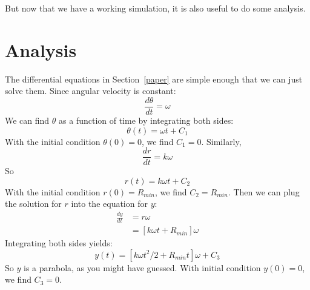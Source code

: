 \documentclass[12pt]{book}
\theoremstyle{exercise}
\newcommand{\py}{\verb}%}
\begin{document}

But now that we have a working simulation, it is also useful to do some analysis.


\section{Analysis}
\label{paper_analysis}

The differential equations in Section~\ref{paper} are simple enough that we can just solve them.  Since angular velocity is constant:
%
\[ \frac{d\theta}{dt} = \omega  \]
%
We can find $\theta$ as a function of time by integrating both sides:
%
\[ \theta(t) = \omega t + C_1 \]
%
With the initial condition $\theta(0)=0$,  we find $C_1=0$.  Similarly,
%
\begin{equation}
\frac{dr}{dt} = k \omega                    \label{eqn1}
\end{equation}
%
So
%
\[ r(t) = k \omega t + C_2 \]
%
With the initial condition $r(0)=R_{min}$,  we find $C_2=R_{min}$.  Then we can plug the solution for $r$ into the equation for $y$:
%
\begin{align}
\frac{dy}{dt} & = r \omega                    \label{eqn2}   \\
              & = \left[ k \omega t + R_{min} \right] \omega \nonumber
\end{align}
%
%
Integrating both sides yields:
%
\[ y(t) = \left[ k \omega t^2 / 2 + R_{min} t \right] \omega + C_3\]
%
So $y$ is a parabola, as you might have guessed.  With initial condition $y(0)=0$, we find $C_3=0$.
\end{document}
